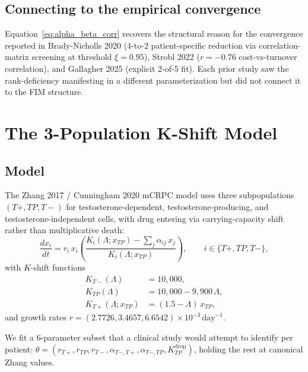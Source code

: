 \documentclass[11pt]{article}
\newcommand{\Kdrop}{K_{TP}^{\text{drop}}}
\newcommand{\Tplus}{T{+}}
\newcommand{\Tminus}{T{-}}
\begin{document}
\subsection{Connecting to the empirical convergence}

Equation~\eqref{eq:alpha_beta_corr} recovers the structural reason for the
convergence reported in Brady-Nicholls 2020 (4-to-2 patient-specific reduction
via correlation-matrix screening at threshold $\xi = 0.95$), Strobl 2022
($r = -0.76$ cost-vs-turnover correlation), and Gallagher 2025 (explicit 2-of-5
fit). Each prior study saw the rank-deficiency manifesting in a different
parameterization but did not connect it to the FIM structure.

\section{The 3-Population K-Shift Model}\label{sec:3pop}

\subsection{Model}

The Zhang 2017 / Cunningham 2020 mCRPC model uses three subpopulations
$(\Tplus, TP, \Tminus)$ for testosterone-dependent, testosterone-producing, and
testosterone-independent cells, with drug entering via carrying-capacity shift
rather than multiplicative death:
\begin{equation}
\frac{dx_i}{dt} = r_i\, x_i\!\left(\frac{K_i(\Lambda; x_{TP}) - \sum_{j} \alpha_{ij}\, x_j}{K_i(\Lambda; x_{TP})}\right),
\qquad i \in \{\Tplus, TP, \Tminus\},
\label{eq:3pop_dynamics}
\end{equation}
with $K$-shift functions
\begin{equation}
\begin{aligned}
K_{\Tminus}(\Lambda) &= 10{,}000, \\
K_{TP}(\Lambda) &= 10{,}000 - 9{,}900\,\Lambda, \\
K_{\Tplus}(\Lambda; x_{TP}) &= (1.5 - \Lambda)\, x_{TP},
\end{aligned}
\label{eq:Kshift}
\end{equation}
and growth rates $r = (2.7726, 3.4657, 6.6542) \times 10^{-3}\,\text{day}^{-1}$.

We fit a 6-parameter subset that a clinical study would attempt to identify per
patient: $\theta = (r_{\Tplus}, r_{TP}, r_{\Tminus}, \alpha_{\Tminus,\Tplus},
\alpha_{\Tminus,TP}, \Kdrop)$, holding the rest at canonical Zhang values.
\end{document}
